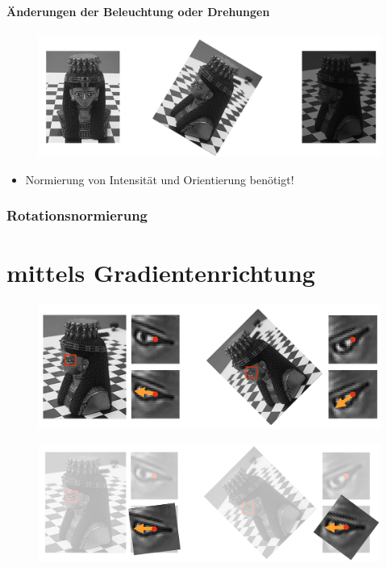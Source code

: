 \documentclass[12pt, a4paper, oneside]{article}
\begin{document}
\paragraph*{Änderungen der Beleuchtung oder Drehungen}
\begin{figure}[htbp]
    \centering
    \includegraphics[scale=0.6]{../img/1-15.png}
    \label{img/1-15}
\end{figure}
\begin{itemize}
  \item Normierung von Intensität und Orientierung benötigt!
\end{itemize}

\subsubsection{Rotationsnormierung}
\section*{mittels Gradientenrichtung}
\begin{figure}[htbp]
    \centering
    \includegraphics[scale=0.6]{../img/1-16.png}
    \label{img/1-16}
\end{figure}
\begin{figure}[htbp]
    \centering
    \includegraphics[scale=0.6]{../img/1-17.png}
    \label{img/1-17}
\end{figure}
\end{document}
